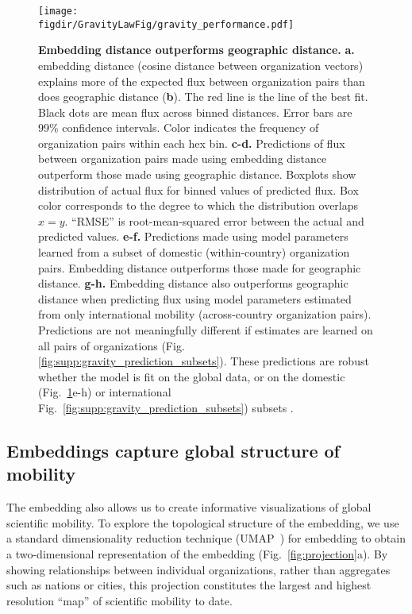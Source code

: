 \documentclass[12pt]{article} %
\def\figdir{../Figs}
\begin{document}
%
%
\begin{figure}[h!]
	\centering
	\texttt{[image: \\figdir/GravityLawFig/gravity\_performance.pdf]}
	\caption{
		\textbf{Embedding distance outperforms geographic distance.}
		\textbf{a.} embedding distance (cosine distance between organization vectors) explains more of the expected flux between organization pairs than does geographic distance (\textbf{b}).
		The red line is the line of the best fit.
		Black dots are mean flux across binned distances.
		Error bars are 99\% confidence intervals.
		Color indicates the frequency of organization pairs within each hex bin.
		\textbf{c-d.} Predictions of flux between organization pairs made using embedding distance outperform those made using geographic distance.
		Boxplots show distribution of actual flux for binned values of predicted flux.
		Box color corresponds to the degree to which the distribution overlaps $x = y$.
		``RMSE'' is root-mean-squared error between the actual and predicted values.
		\textbf{e-f.} Predictions made using model parameters learned from a subset of domestic (within-country) organization pairs.
		Embedding distance outperforms those made for geographic distance.
		\textbf{g-h.} Embedding distance also outperforms geographic distance when predicting flux using model parameters estimated from only international mobility (across-country organization pairs).
		Predictions are not meaningfully different if estimates are learned on all pairs of organizations (Fig. \ref{fig:supp:gravity_prediction_subsets}).
		These predictions are robust whether the model is fit on the global data, or on the domestic (Fig.~\ref{fig:gravity_performance}e-h) or international Fig.~\ref{fig:supp:gravity_prediction_subsets}) subsets .
	}
	\label{fig:gravity_performance}
\end{figure}


\subsection*{Embeddings capture global structure of mobility}

The embedding also allows us to create informative visualizations of global scientific mobility.
To explore the topological structure of the embedding, we use a standard dimensionality reduction technique (UMAP~\autocite{mcinnes2018umap}) for embedding to obtain a two-dimensional representation of the embedding (Fig.~\ref{fig:projection}a).
By showing relationships between individual organizations, rather than aggregates such as nations or cities, this projection constitutes the largest and highest resolution ``map'' of scientific mobility to date.
\end{document}
